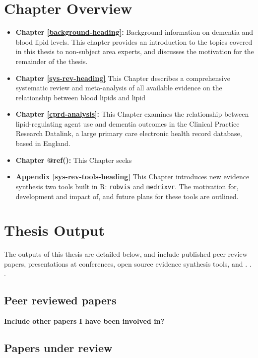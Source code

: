 \documentclass[a4paper, twoside]{templates/ociamthesis}
\begin{document}
\hypertarget{chapter-overview}{%
\section{Chapter Overview}\label{chapter-overview}}

\begin{itemize}
\item
  \textbf{Chapter \ref{background-heading}:} Background information on dementia and blood lipid levels. This chapter provides an introduction to the topics covered in this thesis to non-subject area experts, and discusses the motivation for the remainder of the thesis.
\item
  \textbf{Chapter \ref{sys-rev-heading}} This Chapter describes a comprehensive systematic review and meta-analysis of all available evidence on the relationship between blood lipids and lipid
\item
  \textbf{Chapter \ref{cprd-analysis}:} This Chapter examines the relationship between lipid-regulating agent use and dementia outcomes in the Clinical Practice Research Datalink, a large primary care electronic health record database, based in England.
\item
  \textbf{Chapter @ref():} This Chapter seeks
\item
  \textbf{Appendix \ref{sys-rev-tools-heading}} This Chapter introduces new evidence synthesis two tools built in R: \texttt{robvis} and \texttt{medrixvr}. The motivation for, development and impact of, and future plans for these tools are outlined.
\end{itemize}

\hypertarget{thesis-output}{%
\section{Thesis Output}\label{thesis-output}}

The outputs of this thesis are detailed below, and include published peer review papers, presentations at conferences, open source evidence synthesis tools, and . . .

\hypertarget{peer-reviewed-papers}{%
\subsection{Peer reviewed papers}\label{peer-reviewed-papers}}

\textbf{Include other papers I have been involved in?}

\hypertarget{papers-under-review}{%
\subsection{Papers under review}\label{papers-under-review}}
\end{document}
